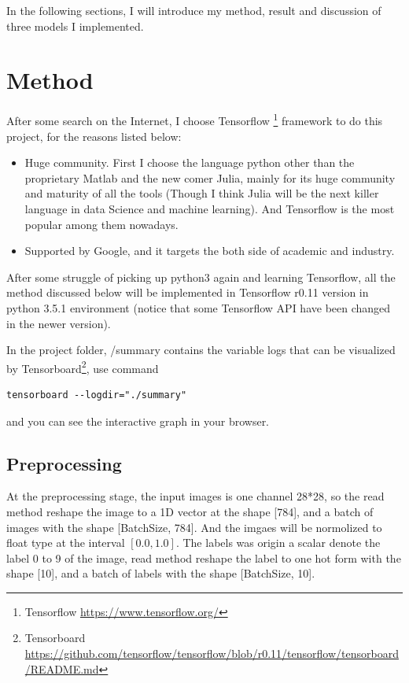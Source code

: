 \documentclass[10pt,twocolumn,letterpaper]{article}
\begin{document}
\begin{CJK}{UTF8}{gbsn}
In the following sections, I will introduce my method, result and discussion of three models I implemented.

\section{Method}

After some search on the Internet, I choose Tensorflow \footnote{Tensorflow \url{https://www.tensorflow.org/}} framework to do this project, for the reasons listed below:
\begin{itemize}
  \item Huge community. First I choose the language python other than the proprietary Matlab and the new comer Julia, mainly for its huge community and maturity of all the tools (Though I think Julia will be the next killer language in data Science and machine learning). And Tensorflow is the most popular among them nowadays.
  \item Supported by Google, and it targets the both side of academic and industry. 
\end{itemize}

After some struggle of picking up python3 again and learning Tensorflow,  all the method discussed below will be implemented in Tensorflow r0.11 version in python 3.5.1 environment (notice that some Tensorflow API have been changed in the newer version).

In the project folder, /summary contains the variable logs that can be visualized by Tensorboard\footnote{Tensorboard \url{https://github.com/tensorflow/tensorflow/blob/r0.11/tensorflow/tensorboard/README.md}}, use command 
\begin{lstlisting}
tensorboard --logdir="./summary"
\end{lstlisting}
and you can see the interactive graph in your browser.

\subsection{Preprocessing}

At the preprocessing stage, the input images is one channel 28*28, so the read method reshape the image to a 1D vector at the shape [784], and a batch of images with the shape [BatchSize, 784]. And the imgaes will be normolized to float type at the interval $[0.0, 1.0]$. The labels was origin a scalar denote the label 0 to 9 of the image, read method reshape the label to one hot form with the shape [10], and a batch of labels with the shape [BatchSize, 10]. 


\end{CJK}
\end{document}

